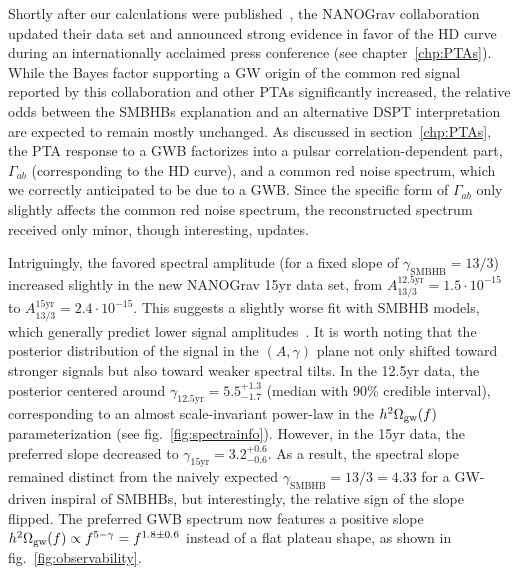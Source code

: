 Shortly after our calculations were published~\cite{Bringmann:2023opz}, the \ac{NANOGrav} collaboration updated their data set and announced strong evidence in favor of the \ac{HD} curve~\cite{Hellings:1983fr} during an internationally acclaimed press conference (see chapter~\ref{chp:PTAs}). While the Bayes factor supporting a \ac{GW} origin of the common red signal reported by this collaboration and other \acp{PTA} significantly increased, the relative  odds between the \acp{SMBHB} explanation and an alternative \ac{DSPT} interpretation are expected to remain mostly unchanged. As discussed in section~\ref{chp:PTAs}, the \ac{PTA} response to a \ac{GWB} factorizes into a pulsar correlation-dependent part, $\Gamma_{ab}$ (corresponding to the \ac{HD} curve), and a common red noise spectrum, which we correctly anticipated to be due to a \ac{GWB}. Since the specific form of $\Gamma_{ab}$ only slightly affects the common red noise spectrum, the reconstructed spectrum received only minor, though interesting, updates.

Intriguingly, the favored spectral amplitude (for a fixed slope of $\gamma_\text{SMBHB} = 13/3$) increased slightly in the new \ac{NANOGrav} 15yr data set, from $A^{12.5\text{yr}}_{13/3} = 1.5 \cdot 10^{-15}$ to $A^{15\text{yr}}_{13/3}= 2.4 \cdot 10^{-15}$. This suggests a slightly worse fit with \ac{SMBHB} models, which generally predict lower signal amplitudes~\cite{NANOGrav:2020bcs, NANOGrav:2023gor, NANOGrav:2023hfp}. It is worth noting that the posterior distribution  of the signal in the $(A, \gamma)$ plane not only shifted toward stronger signals but also toward weaker spectral tilts. In the 12.5yr data, the posterior centered around $\gamma_{12.5\text{yr}} = 5.5^{+1.3}_{-1.7}$ (median with 90\% credible interval), corresponding to an almost scale-invariant power-law in the $h^2 \Omega_{\text{gw}}(f)$ parameterization (see fig.~\ref{fig:spectrainfo}). However, in the 15yr data, the preferred slope decreased to $\gamma_{15\text{yr}}= 3.2^{+0.6}_{-0.6}$. As a result, the spectral slope remained distinct from the naively expected $\gamma_\text{SMBHB} = 13/3 = 4.33$ for a \ac{GW}-driven inspiral of \acp{SMBHB}, but interestingly, the relative sign of the slope flipped. The preferred \ac{GWB} spectrum now features a positive slope $h^2 \Omega_{\text{gw}}(f) \propto f^{5-\gamma} = f^{1.8 \pm 0.6}$ instead of a flat plateau shape, as shown in fig.~\ref{fig:observability}.


